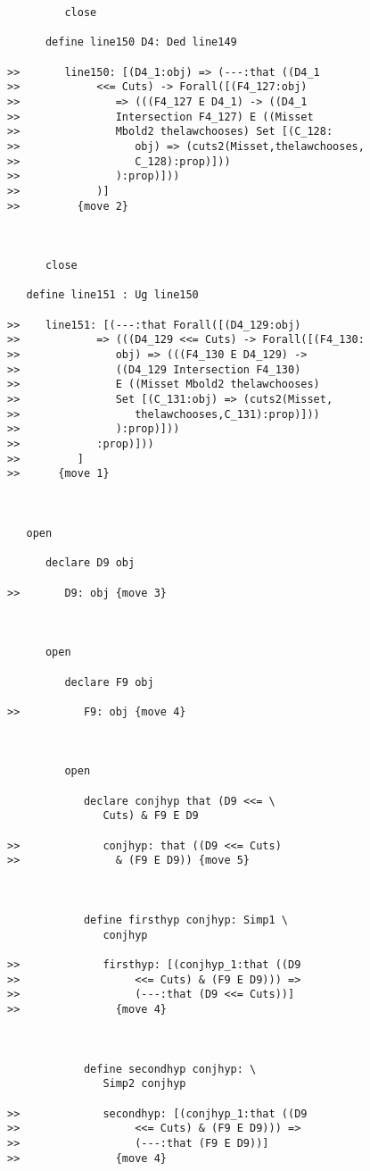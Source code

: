 \documentclass[12pt]{article}
\begin{document}
\begin{verbatim}
         close

      define line150 D4: Ded line149

>>       line150: [(D4_1:obj) => (---:that ((D4_1
>>            <<= Cuts) -> Forall([(F4_127:obj)
>>               => (((F4_127 E D4_1) -> ((D4_1
>>               Intersection F4_127) E ((Misset
>>               Mbold2 thelawchooses) Set [(C_128:
>>                  obj) => (cuts2(Misset,thelawchooses,
>>                  C_128):prop)]))
>>               ):prop)]))
>>            )]
>>         {move 2}



      close

   define line151 : Ug line150

>>    line151: [(---:that Forall([(D4_129:obj)
>>            => (((D4_129 <<= Cuts) -> Forall([(F4_130:
>>               obj) => (((F4_130 E D4_129) ->
>>               ((D4_129 Intersection F4_130)
>>               E ((Misset Mbold2 thelawchooses)
>>               Set [(C_131:obj) => (cuts2(Misset,
>>                  thelawchooses,C_131):prop)]))
>>               ):prop)]))
>>            :prop)]))
>>         ]
>>      {move 1}



   open

      declare D9 obj

>>       D9: obj {move 3}



      open

         declare F9 obj

>>          F9: obj {move 4}



         open

            declare conjhyp that (D9 <<= \
               Cuts) & F9 E D9

>>             conjhyp: that ((D9 <<= Cuts)
>>               & (F9 E D9)) {move 5}



            define firsthyp conjhyp: Simp1 \
               conjhyp

>>             firsthyp: [(conjhyp_1:that ((D9
>>                  <<= Cuts) & (F9 E D9))) =>
>>                  (---:that (D9 <<= Cuts))]
>>               {move 4}



            define secondhyp conjhyp: \
               Simp2 conjhyp

>>             secondhyp: [(conjhyp_1:that ((D9
>>                  <<= Cuts) & (F9 E D9))) =>
>>                  (---:that (F9 E D9))]
>>               {move 4}




\end{verbatim}
\end{document}
